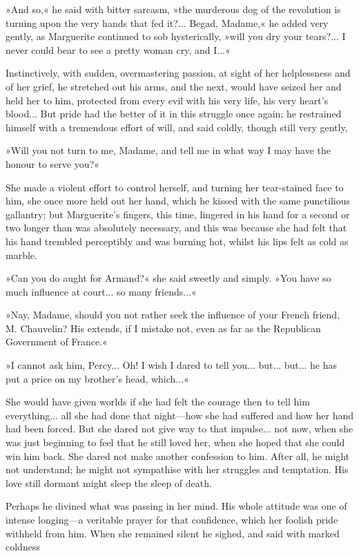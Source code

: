 »And so,« he said with bitter sarcasm, »the murderous dog of the revolution is turning upon the very hands that fed it?... Begad, Madame,« he added very gently, as Marguerite continued to sob hysterically, »will you dry your tears?... I never could bear to see a pretty woman cry, and I...«

Instinctively, with sudden, overmastering passion, at sight of her helplessness and of her grief, he stretched out his arms, and the next, would have seized her and held her to him, protected from every evil with his very life, his very heart's blood... But pride had the better of it in this struggle once again; he restrained himself with a tremendous effort of will, and said coldly, though still very gently,\longdash


»Will you not turn to me, Madame, and tell me in what way I may have the honour to serve you?«

She made a violent effort to control herself, and turning her tear-stained face to him, she once more held out her hand, which he kissed with the same punctilious gallantry; but Marguerite's fingers, this time, lingered in his hand for a second or two longer than was absolutely necessary, and this was because she had felt that his hand trembled perceptibly and was burning hot, whilst his lips felt as cold as marble.

»Can you do aught for Armand?« she said sweetly and simply. »You have so much influence at court... so many friends...«

»Nay, Madame, should you not rather seek the influence of your French friend, M. Chauvelin? His extends, if I mistake not, even as far as the Republican Government of France.«

»I cannot ask him, Percy... Oh! I wish I dared to tell you... but... but... he has put a price on my brother's head, which...«

She would have given worlds if she had felt the courage then to tell him everything... all she had done that night\allowbreak---\allowbreak how she had suffered and how her hand had been forced. But she dared not give way to that impulse... not now, when she was just beginning to feel that he still loved her, when she hoped that she could win him back. She dared not make another confession to him. After all, he might not understand; he might not sympathise with her struggles and temptation. His love still dormant might sleep the sleep of death.

Perhaps he divined what was passing in her mind. His whole attitude was one of intense longing\allowbreak---\allowbreak a veritable prayer for that confidence, which her foolish pride withheld from him. When she remained silent he sighed, and said with marked coldness\longdash


